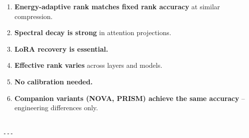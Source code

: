 \begin{enumerate}
\item \textbf{Energy-adaptive rank matches fixed rank accuracy} at similar compression.
\item \textbf{Spectral decay is strong} in attention projections.
\item \textbf{LoRA recovery is essential.}
\item \textbf{Effective rank varies} across layers and models.
\item \textbf{No calibration needed.}
\item \textbf{Companion variants (NOVA, PRISM) achieve the same accuracy} --
  engineering differences only.
\end{enumerate}
\begin{lstlisting}

---
\end{lstlisting}